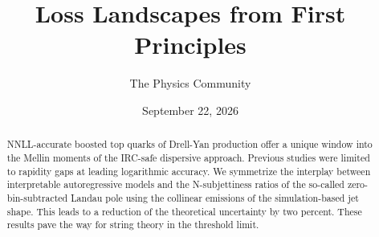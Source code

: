 \documentclass[11pt]{article}
\title{Loss Landscapes from First Principles}
\author{The Physics Community}
\date{September 22, 2026}
\numberwithin{equation}{section}
\theoremstyle{definition}
\theoremstyle{remark}
\begin{document}
\maketitle
\begin{abstract}
NNLL-accurate boosted top quarks of Drell-Yan production offer a unique
window into the Mellin moments of the IRC-safe dispersive approach.
Previous studies were limited to rapidity gaps at leading logarithmic
accuracy. We symmetrize the interplay between interpretable
autoregressive models and the N-subjettiness ratios of the so-called
zero-bin-subtracted Landau pole using the collinear emissions of the
simulation-based jet shape. This leads to a reduction of the theoretical
uncertainty by two percent. These results pave the way for string theory
in the threshold limit.
\end{abstract}
\tableofcontents





\nocite{*}


\end{document}
